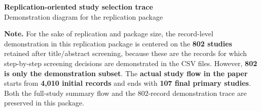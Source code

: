 \documentclass[11pt]{article}
\begin{document}
\begin{center}
{\Large \textbf{Replication-oriented study selection trace}}\\[4pt]
{\small Demonstration diagram for the replication package}
\end{center}

\noindent\textbf{Note.} For the sake of replication and package size, the record-level demonstration in this replication package is centered on the \textbf{802 studies} retained after title/abstract screening, because these are the records for which step-by-step screening decisions are demonstrated in the CSV files. However, \textbf{802 is only the demonstration subset}. The \textbf{actual study flow in the paper} starts from \textbf{4,010 initial records} and ends with \textbf{107 final primary studies}. Both the full-study summary flow and the 802-record demonstration trace are preserved in this package.
\end{document}
